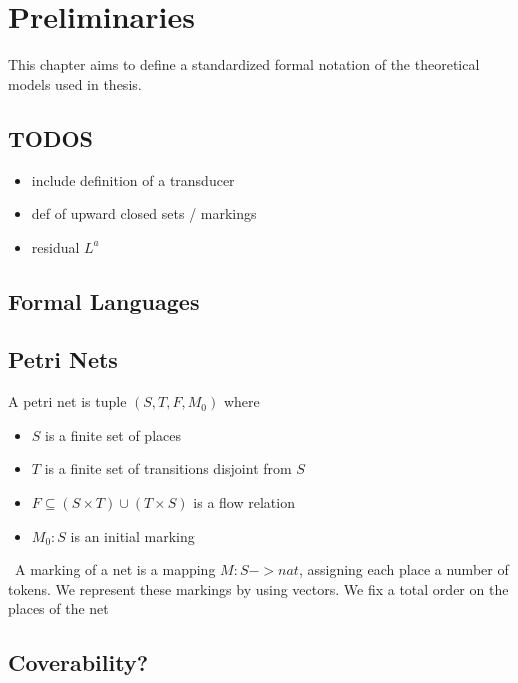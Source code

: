 \chapter{Preliminaries}\label{chapter:preliminaries}
This chapter aims to define a standardized formal notation of the theoretical models used in thesis.

\section{TODOS}
\begin{itemize}
\item include definition of a transducer 
\item def of upward closed sets / markings
\item residual $L^{a}$


\end{itemize}

\section{Formal Languages}

\section{Petri Nets}
A petri net is tuple $(S,T,F,M_{0})$ where 
\begin{itemize}
	\item $S$ is a finite set of places 
	\item $T$ is a finite set of transitions disjoint from $S$
	\item $F \subseteq (S \times T) \cup (T \times S)$ is a flow relation 
	\item $M_{0}: S $ is an initial marking 
\end{itemize}
\
A marking of a net is a mapping $M : S -> nat$, assigning each place a number of tokens. We represent these markings by using vectors. We fix a total order on the places of the net 


\section{Coverability?}